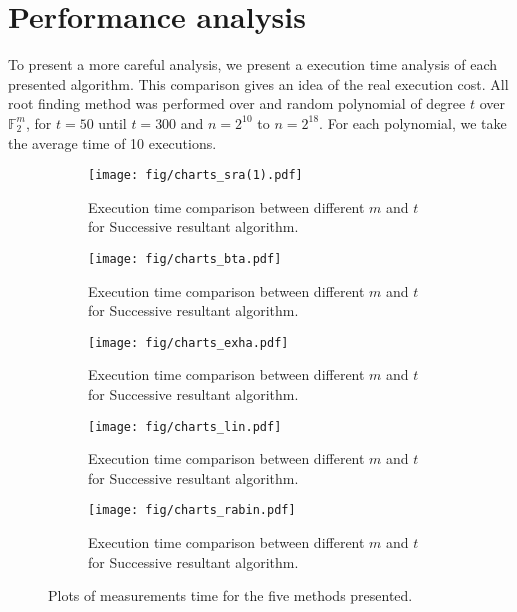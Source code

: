 \section{Performance analysis}
To present a more careful analysis, we present a execution time analysis of each presented algorithm. This comparison gives an idea of the real execution cost. All root finding method was performed over and random polynomial of degree $t$ over $\mathbb{F}_2^m$, for $t = 50$ until $t = 300$ and $n = 2^10$ to $n = 2^{18}$. For each polynomial, we take the average time of 10 executions.
 



\begin{figure}[!ht]
\centering
\begin{subfigure}{0.48\textwidth}
  \centering
  \texttt{[image: fig/charts\_sra(1).pdf]}
  \caption{Execution time comparison between different $m$ and $t$ for Successive resultant algorithm.}
  \label{fig:time-SRA}
\end{subfigure}
\begin{subfigure}{0.48\textwidth}
  \centering
  \texttt{[image: fig/charts\_bta.pdf]}
  \caption{Execution time comparison between different $m$ and $t$ for Successive resultant algorithm.}
  \label{fig:time-BTA}
\end{subfigure}

\begin{subfigure}{0.48\textwidth}
  \centering
  \texttt{[image: fig/charts\_exha.pdf]}
  \caption{Execution time comparison between different $m$ and $t$ for Successive resultant algorithm.}
  \label{fig:time-EXHA}
\end{subfigure}
\begin{subfigure}{0.48\textwidth}
  \centering
  \texttt{[image: fig/charts\_lin.pdf]}
  \caption{Execution time comparison between different $m$ and $t$ for Successive resultant algorithm.}
  \label{fig:time-LIN}
\end{subfigure}
\begin{subfigure}{0.48\textwidth}
  \centering
  \texttt{[image: fig/charts\_rabin.pdf]}
  \caption{Execution time comparison between different $m$ and $t$ for Successive resultant algorithm.}
  \label{fig:time-rabin}
\end{subfigure}

\caption{Plots of measurements time for the five methods presented.}
\label{fig:graph}
\end{figure}

